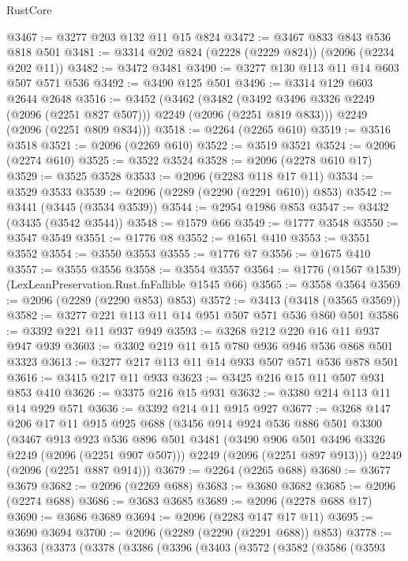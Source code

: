 \begin{lexlean}{RustCore}
\begin{coremodule}
@3467 := @3277 @203 @132 @11 @15 @824
@3472 := @3467 @833 @843 @536 @818 @501
@3481 := @3314 @202 @824 (@2228 (@2229 @824)) (@2096 (@2234 @202 @11))
@3482 := @3472 @3481
@3490 := @3277 @130 @113 @11 @14 @603 @507 @571 @536
@3492 := @3490 @125 @501
@3496 := @3314 @129 @603 @2644 @2648
@3516 := @3452
    (@3462
      (@3482 (@3492 @3496 @3326 @2249 (@2096 (@2251 @827 @507))) @2249 (@2096 (@2251 @819 @833)))
      @2249
      (@2096 (@2251 @809 @834)))
@3518 := @2264 (@2265 @610)
@3519 := @3516 @3518
@3521 := @2096 (@2269 @610)
@3522 := @3519 @3521
@3524 := @2096 (@2274 @610)
@3525 := @3522 @3524
@3528 := @2096 (@2278 @610 @17)
@3529 := @3525 @3528
@3533 := @2096 (@2283 @118 @17 @11)
@3534 := @3529 @3533
@3539 := @2096 (@2289 (@2290 (@2291 @610)) @853)
@3542 := @3441 (@3445 (@3534 @3539))
@3544 := @2954 @1986 @853
@3547 := @3432 (@3435 (@3542 @3544))
@3548 := @1579 @66
@3549 := @1777 @3548
@3550 := @3547 @3549
@3551 := @1776 @8
@3552 := @1651 @410
@3553 := @3551 @3552
@3554 := @3550 @3553
@3555 := @1776 @7
@3556 := @1675 @410
@3557 := @3555 @3556
@3558 := @3554 @3557
@3564 := @1776 (@1567 @1539) (LexLeanPreservation.Rust.fnFallible @1545 @66)
@3565 := @3558 @3564
@3569 := @2096 (@2289 (@2290 @853) @853)
@3572 := @3413 (@3418 (@3565 @3569))
@3582 := @3277 @221 @113 @11 @14 @951 @507 @571 @536 @860 @501
@3586 := @3392 @221 @11 @937 @949
@3593 := @3268 @212 @220 @16 @11 @937 @947 @939
@3603 := @3302 @219 @11 @15 @780 @936 @946 @536 @868 @501 @3323
@3613 := @3277 @217 @113 @11 @14 @933 @507 @571 @536 @878 @501
@3616 := @3415 @217 @11 @933
@3623 := @3425 @216 @15 @11 @507 @931 @853 @410
@3626 := @3375 @216 @15 @931
@3632 := @3380 @214 @113 @11 @14 @929 @571
@3636 := @3392 @214 @11 @915 @927
@3677 := @3268
    @147
    @206
    @17
    @11
    @915
    @925
    @688
    (@3456
      @914
      @924
      @536
      @886
      @501
      @3300
      (@3467
        @913
        @923
        @536
        @896
        @501
        @3481
        (@3490 @906 @501 @3496 @3326 @2249 (@2096 (@2251 @907 @507)))
        @2249
        (@2096 (@2251 @897 @913)))
      @2249
      (@2096 (@2251 @887 @914)))
@3679 := @2264 (@2265 @688)
@3680 := @3677 @3679
@3682 := @2096 (@2269 @688)
@3683 := @3680 @3682
@3685 := @2096 (@2274 @688)
@3686 := @3683 @3685
@3689 := @2096 (@2278 @688 @17)
@3690 := @3686 @3689
@3694 := @2096 (@2283 @147 @17 @11)
@3695 := @3690 @3694
@3700 := @2096 (@2289 (@2290 (@2291 @688)) @853)
@3778 := @3363
    (@3373
      (@3378
        (@3386
          (@3396
            (@3403
              (@3572
                (@3582
                  (@3586
                    (@3593

\end{coremodule}
\end{lexlean}
